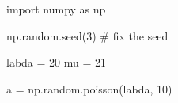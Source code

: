 
import numpy as np

np.random.seed(3) # fix the seed

labda = 20
mu = 21

a = np.random.poisson(labda, 10)


